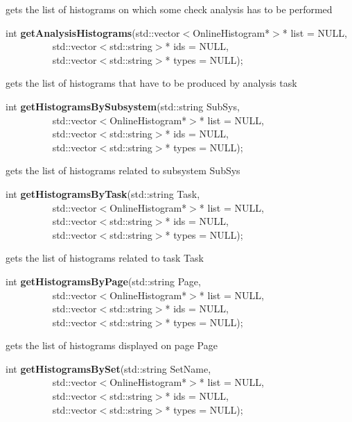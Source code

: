  gets the list of histograms on which some check analysis has to be performed 


\item    int {\bf getAnalysisHistograms}(std::vector$<$OnlineHistogram*$>$* list = NULL,\\\mbox{}~~~~~~~~~
			    std::vector$<$std::string$>$* ids = NULL,\\\mbox{}~~~~~~~~~
			    std::vector$<$std::string$>$* types = NULL);

 gets the list of histograms that have to be produced by analysis task


\item    int {\bf getHistogramsBySubsystem}(std::string SubSys,\\\mbox{}~~~~~~~~~
			       std::vector$<$OnlineHistogram*$>$* list = NULL,\\\mbox{}~~~~~~~~~
			       std::vector$<$std::string$>$* ids = NULL,\\\mbox{}~~~~~~~~~
			       std::vector$<$std::string$>$* types = NULL);

 gets the list of histograms related to subsystem SubSys


\item    int {\bf getHistogramsByTask}(std::string Task,\\\mbox{}~~~~~~~~~
			  std::vector$<$OnlineHistogram*$>$* list = NULL,\\\mbox{}~~~~~~~~~
			  std::vector$<$std::string$>$* ids = NULL,\\\mbox{}~~~~~~~~~
			  std::vector$<$std::string$>$* types = NULL);

 gets the list of histograms related to task Task


\item    int {\bf getHistogramsByPage}(std::string Page,\\\mbox{}~~~~~~~~~
			  std::vector$<$OnlineHistogram*$>$* list = NULL,\\\mbox{}~~~~~~~~~
			  std::vector$<$std::string$>$* ids = NULL,\\\mbox{}~~~~~~~~~
			  std::vector$<$std::string$>$* types = NULL);

 gets the list of histograms displayed on page Page


\item    int {\bf getHistogramsBySet}(std::string SetName,\\\mbox{}~~~~~~~~~
			 std::vector$<$OnlineHistogram*$>$* list = NULL,\\\mbox{}~~~~~~~~~
			 std::vector$<$std::string$>$* ids = NULL,\\\mbox{}~~~~~~~~~
			 std::vector$<$std::string$>$* types = NULL);

